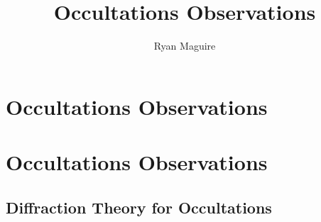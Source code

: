 \documentclass[crop=false,class=book,oneside]{standalone}
\begin{document}
    \ifx\ifplanetdiff\undefined
        \newif\iffunct
        \title{Occultations Observations}
        \author{Ryan Maguire}
        \date{\vspace{-5ex}}
        \maketitle
        \tableofcontents
        \clearpage
        \setcounter{chapter}{3}
        \chapter{Occultations Observations}
    \else
        \chapter{Occultations Observations}
    \fi
    \section{Diffraction Theory for Occultations}
\end{document}
